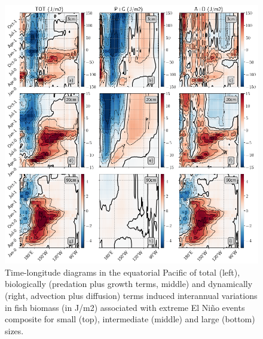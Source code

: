 \begin{figure}[h!tp]
	\centering
	\includegraphics[scale=0.4]{figs/fig7.png}	
	\caption{Time-longitude diagrams in the equatorial Pacific of total (left), biologically (predation plus growth terms, middle) and dynamically (right, advection plus diffusion) terms induced interannual variations in fish biomass (in J/m2) associated with extreme El Niño events composite for small (top), intermediate (middle) and large (bottom) sizes.}
	\label{fig:fig7}
\end{figure}

